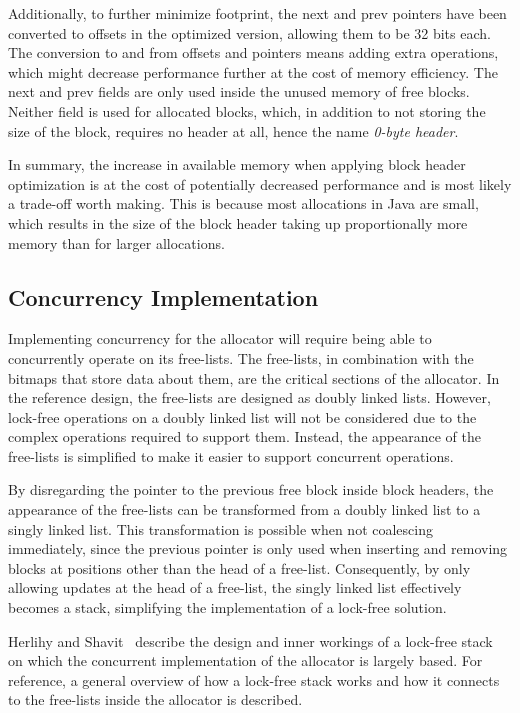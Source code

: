 Additionally, to further minimize footprint, the next and prev pointers have been converted to offsets in the optimized version, allowing them to be 32 bits each. The conversion to and from offsets and pointers means adding extra operations, which might decrease performance further at the cost of memory efficiency. The next and prev fields are only used inside the unused memory of free blocks. Neither field is used for allocated blocks, which, in addition to not storing the size of the block, requires no header at all, hence the name \textit{0-byte header}.

In summary, the increase in available memory when applying block header optimization is at the cost of potentially decreased performance and is most likely a trade-off worth making. This is because most allocations in Java are small, which results in the size of the block header taking up proportionally more memory than for larger allocations.

\subsection{Concurrency Implementation}
\label{sec:adaptations_impl:concurrency}

Implementing concurrency for the allocator will require being able to concurrently operate on its free-lists. The free-lists, in combination with the bitmaps that store data about them, are the critical sections of the allocator. In the reference design, the free-lists are designed as doubly linked lists. However, lock-free operations on a doubly linked list will not be considered due to the complex operations required to support them. Instead, the appearance of the free-lists is simplified to make it easier to support concurrent operations.

By disregarding the pointer to the previous free block inside block headers, the appearance of the free-lists can be transformed from a doubly linked list to a singly linked list. This transformation is possible when not coalescing immediately, since the previous pointer is only used when inserting and removing blocks at positions other than the head of a free-list. Consequently, by only allowing updates at the head of a free-list, the singly linked list effectively becomes a stack, simplifying the implementation of a lock-free solution.

Herlihy and Shavit~\cite[Chapter 11]{artofmpprogramming} describe the design and inner workings of a lock-free stack on which the concurrent implementation of the allocator is largely based. For reference, a general overview of how a lock-free stack works and how it connects to the free-lists inside the allocator is described.

